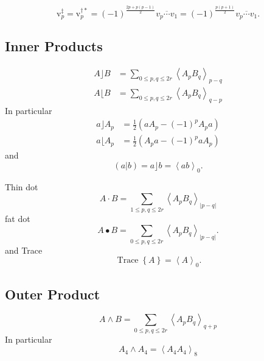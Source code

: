 \documentclass[aps,preprint]{revtex4}%
\begin{document}
\begin{equation}
\mathrm{v}_{p}^{\ddagger}=\mathrm{v}_{p}^{\dagger\ast}=\left(  -1\right)
^{\frac{2p+p\left(  p-1\right)  }{2}}\overline{v_{p}\cdots v_{1}}=\left(
-1\right)  ^{\frac{p\left(  p+1\right)  }{2}}\overline{v_{p}\cdots v_{1}}.
\end{equation}


\subsection{Inner Products}%

\begin{align}
A\rfloor B  &  =\sum_{0\leq p,q\leq2r}\left\langle A_{p}B_{q}\right\rangle
_{p-q}\\
A\lfloor B  &  =\sum_{0\leq p,q\leq2r}\left\langle A_{p}B_{q}\right\rangle
_{q-p}%
\end{align}
In particular
\begin{align}
a\rfloor A_{p}  &  =\frac{1}{2}\left(  aA_{p}-\left(  -1\right)  ^{p}%
A_{p}a\right) \\
a\lfloor A_{p}  &  =\frac{1}{2}\left(  A_{p}a-\left(  -1\right)  ^{p}%
aA_{p}\right)
\end{align}
and
\begin{equation}
\left(  \left.  a\right\vert b\right)  =a\rfloor b=\left\langle
ab\right\rangle _{0}.
\end{equation}


Thin dot%
\begin{equation}
A\cdot B=\sum_{1\leq p,q\leq2r}\left\langle A_{p}B_{q}\right\rangle
_{\left\vert p-q\right\vert }%
\end{equation}
fat dot
\begin{equation}
A\bullet B=\sum_{0\leq p,q\leq2r}\left\langle A_{p}B_{q}\right\rangle
_{\left\vert p-q\right\vert }.
\end{equation}
and Trace%
\begin{equation}
\operatorname*{Trace}\left\{  A\right\}  =\left\langle A\right\rangle _{0}.
\end{equation}


\subsection{Outer Product}%

\begin{equation}
A\wedge B=\sum_{0\leq p,q\leq2r}\left\langle A_{p}B_{q}\right\rangle _{q+p}%
\end{equation}
In particular
\begin{equation}
A_{4}\wedge A_{4}=\left\langle A_{4}A_{4}\right\rangle _{8}%
\end{equation}
\end{document}

